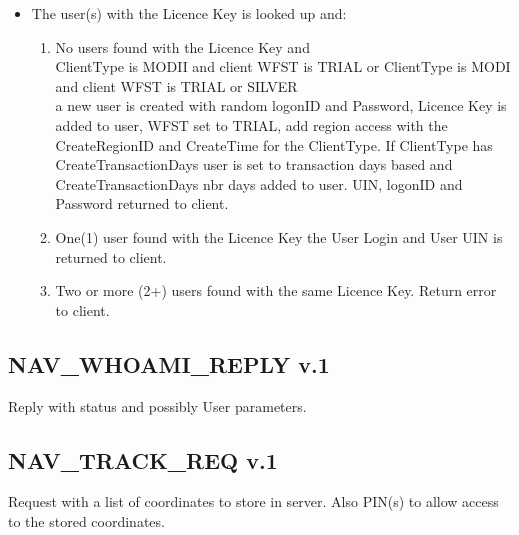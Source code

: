 \documentclass[a4paper]{article}
\begin{document}
\begin{itemize}
\item The user(s) with the Licence Key is looked up and:
  \begin{enumerate}
  \item No users found with the Licence Key and \\
    ClientType is MODII and client WFST is TRIAL or
    ClientType is MODI and client WFST is TRIAL or SILVER \\
    a new user is created with
    random logonID and Password, Licence Key is added to user, 
    WFST set to TRIAL, add region access with the CreateRegionID
    and CreateTime for the ClientType.
    If ClientType has CreateTransactionDays user is set to transaction
    days based and CreateTransactionDays nbr days added to user.
    UIN, logonID and Password returned to client.
  \item One(1) user found with the Licence Key the User Login and User UIN is
    returned to client.
  \item Two or more (2+) users found with the same Licence Key. 
    Return error to client.
  \end{enumerate}
\end{itemize}


\subsection{NAV\_WHOAMI\_REPLY v.1}

Reply with status and possibly User parameters.

\subsection{NAV\_TRACK\_REQ v.1}
\label{NAV_TRACK_REQ}

Request with a list of coordinates to store in server. Also PIN(s) to
allow access to the stored coordinates.
\end{document}
